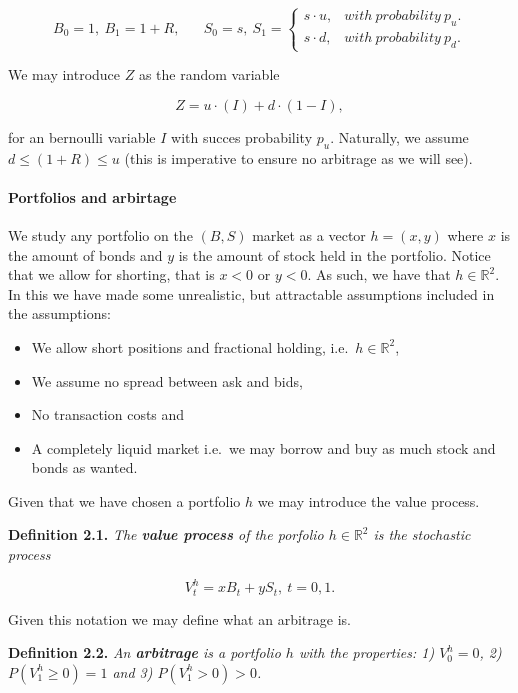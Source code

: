 \documentclass[
]{article}
\providecommand{\tightlist}{%
  \setlength{\itemsep}{0pt}\setlength{\parskip}{0pt}}
\begin{document}
\[
B_0=1,\ B_1=1+R,\hspace{20pt}S_0=s,\ S_1=\left\{\begin{matrix}s\cdot u, & with\ probability\ p_u.\\s\cdot d, & with\ probability\ p_d.\end{matrix}\right.
\]

We may introduce \(Z\) as the random variable

\[
Z=u\cdot (I)+d\cdot (1-I),
\]

for an bernoulli variable \(I\) with succes probability \(p_u\).
Naturally, we assume \(d\le (1+R)\le u\) (this is imperative to ensure
no arbitrage as we will see).

\hypertarget{portfolios-and-arbirtage}{%
\paragraph{Portfolios and arbirtage}\label{portfolios-and-arbirtage}}

We study any portfolio on the \((B,S)\) market as a vector \(h=(x,y)\)
where \(x\) is the amount of bonds and \(y\) is the amount of stock held
in the portfolio. Notice that we allow for shorting, that is \(x<0\) or
\(y<0\). As such, we have that \(h\in \mathbb{R}^2\). In this we have
made some unrealistic, but attractable assumptions included in the
assumptions:

\begin{itemize}
\tightlist
\item
  We allow short positions and fractional holding,
  i.e.~\(h\in \mathbb{R}^2\),
\item
  We assume no spread between ask and bids,
\item
  No transaction costs and
\item
  A completely liquid market i.e.~we may borrow and buy as much stock
  and bonds as wanted.
\end{itemize}

Given that we have chosen a portfolio \(h\) we may introduce the value
process.

\textbf{Definition 2.1.} \emph{The \textbf{value process} of the
porfolio \(h\in\mathbb{R}^2\) is the stochastic process}

\[V^h_t=xB_t+yS_t,\ t=0,1.\]

Given this notation we may define what an arbitrage is.

\textbf{Definition 2.2.} \emph{An \textbf{arbitrage} is a portfolio
\(h\) with the properties: 1) \(V^h_0=0\), 2) \(P(V^h_1\ge 0)=1\) and 3)
\(P(V^h_1>0)>0\).}
\end{document}
